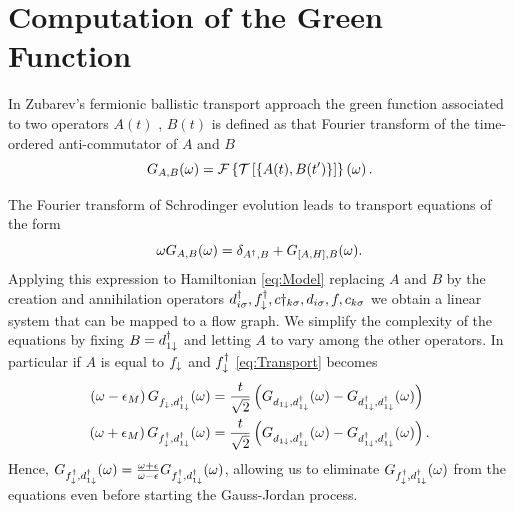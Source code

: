 \documentclass[showpacs,aps,prb,reprint,superscriptaddress]{revtex4-1}
\newcommand{\LUIS}[1]{\textcolor{blue}{\fbox{Luis} {\sl#1}}}
\begin{document}






 \appendix

 
 \section{Computation of the Green Function  \label{sec:Appendix_alg}}
 
 

 

 In Zubarev's fermionic ballistic transport approach \cite{zubarev_double-time_1960} the green function associated to two operators $A(t)$ , $B(t)$ is defined as that Fourier transform of the time-ordered anti-commutator of $A$ and $B$
\begin{equation}
  G_{A,B}(\omega)= \mathcal{F}\left\{ \mathcal{T}\left[\left\{ A(t),B(t')\right\} \right]\right\} \left(\omega\right).
  \label{eq:greenFunction}
\end{equation}

The Fourier transform of Schrodinger evolution leads to transport equations of the form
\begin{equation}
    \omega G_{A,B}(\omega)=\delta_{A^{\dagger},B}+G_{\left[A,H\right],B}(\omega).
    \label{eq:Transport}
\end{equation}
\noindent Applying this expression to Hamiltonian \eqref{eq:Model} replacing $A$ and $B$ by the creation and annihilation operators $d^\dagger_{i\sigma}, f^\dagger_\downarrow,c\dagger_{k\sigma}, d_{i\sigma},f ,c_{k\sigma}$ we obtain a linear system that can be mapped to a flow graph. We simplify the complexity of the equations by fixing $B = d^\dagger_{1\downarrow}$ and letting $A$ to vary among the other operators. In particular if $A$ is equal to   $f_\downarrow$ and $f^\dagger_\downarrow$ \eqref{eq:Transport} becomes
\begin{align}
        \left(\omega-\epsilon_{M}\right)G_{f_{\downarrow},d_{1\downarrow}^{\dagger}}(\omega)&=\frac{t}{\sqrt{2}}\left(G_{d_{1\downarrow},d_{1\downarrow}^{\dagger}}(\omega)-G_{d_{1\downarrow}^{\dagger},d_{1\downarrow}^{\dagger}}(\omega)\right) \\
    \left(\omega+\epsilon_{M}\right)G_{f_{\downarrow}^{\dagger},d_{1\downarrow}^{\dagger}}(\omega)&=\frac{t}{\sqrt{2}}\left(G_{d_{1\downarrow},d_{1\downarrow}^{\dagger}}(\omega)-G_{d_{1\downarrow}^{\dagger},d_{1\downarrow}^{\dagger}}(\omega)\right).
\end{align}
\noindent Hence, $G_{f_{\downarrow}^{\dagger},d_{1\downarrow}^{\dagger}}(\omega) = \frac{\omega + \epsilon}{\omega -\epsilon}G_{f_{\downarrow}^{\dagger},d_{1\downarrow}^{\dagger}}(\omega) $, allowing us to  eliminate $G_{f_{\downarrow}^{\dagger},d_{1\downarrow}^{\dagger}}(\omega) $ from the equations even before starting the Gauss-Jordan process.
\end{document}
